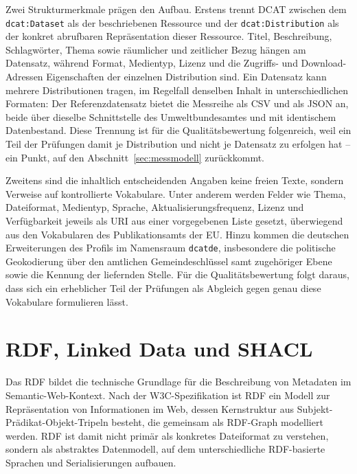 Zwei Strukturmerkmale prägen den Aufbau. Erstens trennt DCAT zwischen dem \\ \texttt{dcat:Dataset} als der beschriebenen Ressource und der \texttt{dcat:Distribution} als der konkret abrufbaren Repräsentation dieser Ressource. Titel, Beschreibung, Schlagwörter, Thema sowie räumlicher und zeitlicher Bezug hängen am Datensatz, während Format, Medientyp, Lizenz und die Zugriffs- und Download-Adressen Eigenschaften der einzelnen Distribution sind. Ein Datensatz kann mehrere Distributionen tragen, im Regelfall denselben Inhalt in unterschiedlichen Formaten: Der Referenzdatensatz bietet die Messreihe als \acrfull{CSV} und als \acrfull{JSON} an, beide über dieselbe Schnittstelle des Umweltbundesamtes und mit identischem Datenbestand. Diese Trennung ist für die Qualitätsbewertung folgenreich, weil ein Teil der Prüfungen damit je Distribution und nicht je Datensatz zu erfolgen hat -- ein Punkt, auf den Abschnitt~\ref{sec:messmodell} zurückkommt.

Zweitens sind die inhaltlich entscheidenden Angaben keine freien Texte, sondern Verweise auf kontrollierte Vokabulare. Unter anderem werden Felder wie Thema, Dateiformat, Medientyp, Sprache, Aktualisierungsfrequenz, Lizenz und Verfügbarkeit jeweils als \acrfull{URI} aus einer vorgegebenen Liste gesetzt, überwiegend aus den Vokabularen des Publikationsamts der \acrfull{EU}. Hinzu kommen die deutschen Erweiterungen des Profils im Namensraum \texttt{dcatde}, insbesondere die politische Geokodierung über den amtlichen Gemeindeschlüssel samt zugehöriger Ebene sowie die Kennung der liefernden Stelle. Für die Qualitätsbewertung folgt daraus, dass sich ein erheblicher Teil der Prüfungen als Abgleich gegen genau diese Vokabulare formulieren lässt.

\section{RDF, Linked Data und SHACL}

Das \acrfull{RDF} bildet die technische Grundlage für die Beschreibung von Metadaten im Semantic-Web-Kontext. Nach der W3C-Spezifikation ist RDF ein Modell zur Repräsentation von Informationen im Web, dessen Kernstruktur aus Subjekt-Prädikat-Objekt-Tripeln besteht, die gemeinsam als RDF-Graph modelliert werden. RDF ist damit nicht primär als konkretes Dateiformat zu verstehen, sondern als abstraktes Datenmodell, auf dem unterschiedliche RDF-basierte Sprachen und Serialisierungen aufbauen. \cite{W3CRDF11Concepts}

